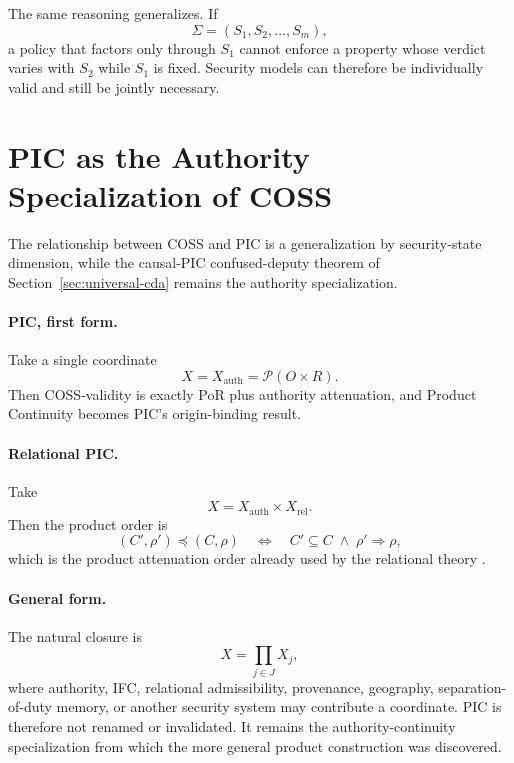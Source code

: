 \documentclass[10pt,twocolumn]{article}
\newcommand{\Model}{\textnormal{\textsc{COSS}}\xspace}
\newcommand{\powerset}{\mathcal{P}}
\newcommand{\state}{\Sigma}
\begin{document}
The same reasoning generalizes.  If
\begin{equation}
  \state=(S_1,S_2,\ldots,S_m),
\end{equation}
a policy that factors only through $S_1$ cannot enforce a property whose
verdict varies with $S_2$ while $S_1$ is fixed.  Security models can therefore
be individually valid and still be jointly necessary.


\section{PIC as the Authority Specialization of COSS}

The relationship between \Model and PIC is a generalization by security-state dimension, while the causal-PIC confused-deputy theorem of Section~\ref{sec:universal-cda} remains the authority specialization.

\paragraph{PIC, first form.}
Take a single coordinate
\begin{equation}
  X=X_{\mathrm{auth}}=\powerset(O\times R).
\end{equation}
Then \Model-validity is exactly PoR plus authority attenuation, and Product
Continuity becomes PIC's origin-binding result.

\paragraph{Relational PIC.}
Take
\begin{equation}
  X=X_{\mathrm{auth}}\times X_{\mathrm{rel}}.
\end{equation}
Then the product order is
\begin{equation}
  (C',\rho')\preceq(C,\rho)
  \quad\Longleftrightarrow\quad
  C'\subseteq C\;\land\;\rho'\Rightarrow\rho,
\end{equation}
which is the product attenuation order already used by the relational theory
\cite{gallo_relational2026}.

\paragraph{General form.}
The natural closure is
\begin{equation}
  X=\prod_{j\in J}X_j,
\end{equation}
where authority, IFC, relational admissibility, provenance, geography,
separation-of-duty memory, or another security system may contribute a
coordinate.  PIC is therefore not renamed or invalidated.  It remains the
authority-continuity specialization from which the more general product
construction was discovered.
\end{document}
